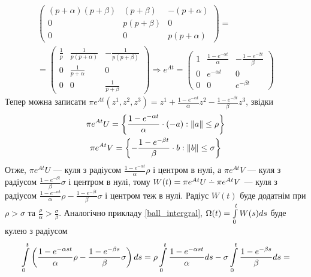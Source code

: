 \begin{example}
\begin{gather*}
\begin{pmatrix}
            (p+\alpha)(p+\beta) & (p+\beta) & -(p+\alpha) \\
            0 & p(p+\beta) & 0 \\
            0 & 0 & p(p+\alpha)
        \end{pmatrix} = \\ =
        \begin{pmatrix}
            \frac{1}{p} & \frac{1}{p(p+\alpha)} & - \frac{1}{p(p+\beta)} \\
            0 & \frac{1}{p+\alpha} & 0 \\
            0 & 0 & \frac{1}{p+\beta}
        \end{pmatrix} \Rightarrow
        e^{At} = \begin{pmatrix}
            1 & \frac{1 - e^{-\alpha t}}{\alpha} & -\frac{1 - e^{-\beta t}}{\beta} \\
            0 & e^{-\alpha t} & 0 \\
            0 & 0 & e^{-\beta t}
        \end{pmatrix}
    \end{gather*}
    Тепер можна записати $\pi e^{At}(z^1, z^2, z^3) = z^1 + \frac{1 - e^{-\alpha t}}{\alpha} z^2 - \frac{1 - e^{-\beta t}}{\beta}z^3$, звідки
    \begin{gather*}
        \pi e^{At} U = \left\{\frac{1 - e^{-\alpha t}}{\alpha} \cdot (-a) : \left\Vert a \right\Vert \leq \rho\right\} \\ 
        \pi e^{At} V = \left\{-\frac{1 - e^{-\beta t}}{\beta} \cdot b : \left\Vert b \right\Vert \leq \sigma\right\}
    \end{gather*}
    Отже, $\pi e^{At} U$ --- куля з радіусом $\frac{1 - e^{-\alpha t}}{\alpha}\rho$ і центром в нулі,
    а $\pi e^{At} V$ --- куля з радіусом $\frac{1 - e^{-\beta t}}{\beta}\sigma$ і центром в нулі, тому
    $W(t) = \pi e^{At}U \setdif \pi e^{At}V$ --- куля з радіусом 
    $\frac{1 - e^{-\alpha t}}{\alpha}\rho - \frac{1 - e^{-\beta t}}{\beta}\sigma$ і центром теж в нулі.
    Радіус $W(t)$ буде додатнім при $\rho > \sigma$ та $\frac{\rho}{\alpha} > \frac{\sigma}{\beta}$.
    Аналогічно прикладу \ref{ball_intergral}, $\Omega(t) = \int\limits_0^t W(s) ds$ буде кулею
    з радіусом
    \begin{gather*}
        \int\limits_0^t \left(\frac{1 - e^{-\alpha st}}{\alpha}\rho - \frac{1 - e^{-\beta s}}{\beta} \sigma\right) ds = 
        \rho \int\limits_0^t \frac{1 - e^{-\alpha st}}{\alpha} ds - \sigma \int\limits_0^t \frac{1 - e^{-\beta s}}{\beta} ds =
    \end{gather*}
    \begin{gather*}

\end{gather*}
\end{example}

